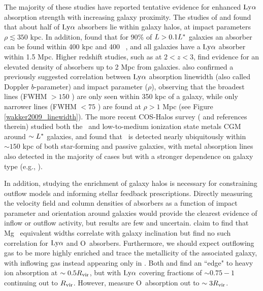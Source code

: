 The majority of these studies have reported tentative evidence for enhanced $\rm Ly\alpha$ absorption strength with increasing galaxy proximity. The studies of \cite{cote2005} and \cite{prochaska2006} found that about half of $\rm Ly\alpha$ absorbers lie within galaxy halos, at impact parameters $\rho \lesssim 350$ kpc. In addition, \cite{wakker2009} found that for 90\% of $L > 0.1 L^{\**}$ galaxies an absorber can be found within 400 kpc and 400 \kms~, and all galaxies have a $\rm Ly\alpha$ absorber within 1.5 Mpc. Higher redshift studies, such as \cite{rudie2012a} at $2 < z < 3$, find evidence for an elevated density of absorbers up to 2 Mpc from galaxies. \cite{wakker2009} also confirmed a previously suggested correlation between $\rm Ly\alpha$ absorption linewidth (also called Doppler $b$-parameter) and impact parameter ($\rho$), observing that the broadest lines (FWHM $>150$ \kms) are only seen within 350 kpc of a galaxy, while only narrower lines (FWHM $<75$ \kms) are found at $\rho > 1$ Mpc (see Figure \ref{wakker2009_linewidth}). The more recent COS-Halos survey (\citealt{tumlinson2013} and references therein) studied both the \HI~and low-to-medium ionization state metals CGM around $\sim L^{\**}$ galaxies, and found that \HI~is detected nearly ubiquitously within $\sim150$ kpc of both star-forming and passive galaxies, with metal absorption lines also detected in the majority of cases but with a stronger dependence on galaxy type (e.g., \citealt{tumlinson2011b, werk2013}). 


In addition, studying the enrichment of galaxy halos is necessary for constraining outflow models and informing stellar feedback prescriptions. Directly measuring the velocity field and column densities of absorbers as a function of impact parameter and orientation around galaxies would provide the clearest evidence of inflow or outflow activity, but results are few and uncertain. \cite{kacprzak2011_inclination} claim to find that Mg\II~ equivalent widths correlate with galaxy inclination but \cite{mathes2014} find no such correlation for $\rm Ly\alpha$ and O\VI~absorbers. Furthermore, we should expect outflowing gas to be more highly enriched and trace the metallicity of the associated galaxy, with inflowing gas instead appearing only in \HI. Both \cite{stocke2013} and \cite{liang2014} find an ``edge" to heavy ion absorption at $\sim 0.5 R_{\rm vir}$, but with $\rm Ly\alpha$ covering fractions of $\sim 0.75 - 1$ continuing out to $R_{\rm vir}$. However, \cite{mathes2014} measure O\VI~absorption out to $\sim 3 R_{\rm vir}$.


